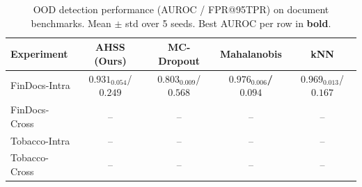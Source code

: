 \begin{table}[t]
\centering
\caption{OOD detection performance (AUROC / FPR@95TPR) on document benchmarks. Mean $\pm$ std over 5 seeds. Best AUROC per row in \textbf{bold}.}
\label{tab:main_results}
\begin{tabular}{lcccc}
\toprule
Experiment & AHSS (Ours) & MC-Dropout & Mahalanobis & kNN \\
\midrule
FinDocs-Intra & $0.931_{0.054}$/$0.249$ & $0.803_{0.009}$/$0.568$ & \textbf{$0.976_{0.006}$/$0.094$} & $0.969_{0.013}$/$0.167$ \\
FinDocs-Cross & -- & -- & -- & -- \\
Tobacco-Intra & -- & -- & -- & -- \\
Tobacco-Cross & -- & -- & -- & -- \\
\bottomrule
\end{tabular}
\end{table}